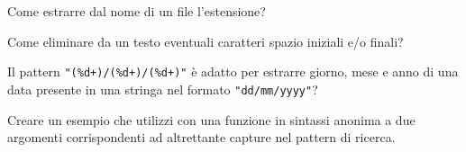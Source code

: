 \begin{Exercise}[label=libstd-04]
Come estrarre dal nome di un file l'estensione?
\end{Exercise}

\begin{Exercise}[label=libstd-05]
Come eliminare da un testo eventuali caratteri spazio iniziali e/o finali?
\end{Exercise}

\begin{Exercise}[label=libstd-06]
Il pattern \verb|"(%d+)/(%d+)/(%d+)"| è adatto per estrarre giorno, mese e
anno di una data presente in una stringa nel formato \verb|"dd/mm/yyyy"|?
\end{Exercise}

\begin{Exercise}[label=libstd-07]
Creare un esempio che utilizzi  con una funzione in sintassi
anonima a due argomenti corrispondenti ad altrettante capture nel pattern di
ricerca.
\end{Exercise}



